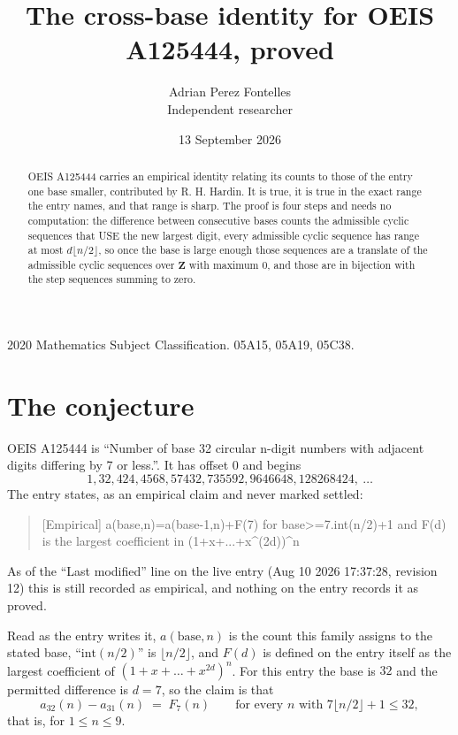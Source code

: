 \documentclass[11pt,a4paper]{article}
\title{The cross-base identity for OEIS A125444, proved}
\author{Adrian Perez Fontelles\\ \small Independent researcher}
\date{13 September 2026}
\theoremstyle{plain}
\theoremstyle{definition}
\begin{document}
\maketitle

\begin{abstract}
OEIS A125444 carries an empirical identity relating its counts to those of the entry one base
smaller, contributed by R. H. Hardin. It is true, it is true in the exact range the entry
names, and that range is sharp. The proof is four steps and needs no computation: the
difference between consecutive bases counts the admissible cyclic sequences that USE the new
largest digit, every admissible cyclic sequence has range at most $d\lfloor n/2\rfloor$, so
once the base is large enough those sequences are a translate of the admissible cyclic
sequences over $\mathbf{Z}$ with maximum $0$, and those are in bijection with the step
sequences summing to zero.
\end{abstract}

\noindent\small 2020 Mathematics Subject Classification. 05A15, 05A19, 05C38.\normalsize

\section{The conjecture}

OEIS A125444 is ``Number of base 32 circular n-digit numbers with adjacent digits differing by 7 or less.''. It has offset $0$ and begins
\[
1, 32, 424, 4568, 57432, 735592, 9646648, 128268424,\ \dots
\]
The entry states, as an empirical claim and never marked settled:
\begin{quote}
[Empirical] a(base,n)=a(base-1,n)+F(7) for base>=7.int(n/2)+1 and F(d) is the largest coefficient in (1+x+...+x\textasciicircum{}(2d))\textasciicircum{}n
\end{quote}
As of the ``Last modified'' line on the live entry (Aug 10 2026 17:37:28, revision 12)
this is still recorded as empirical, and nothing on the entry records it as proved.

Read as the entry writes it, $a(\mathrm{base},n)$ is the count this family assigns to the
stated base, ``$\mathrm{int}(n/2)$'' is $\lfloor n/2\rfloor$, and $F(d)$ is defined on the
entry itself as the largest coefficient of $(1+x+\dots+x^{2d})^{n}$. For this entry
the base is $32$ and the permitted difference is $d=7$, so the claim is that
\[
a_{32}(n)-a_{31}(n)\;=\;F_{7}(n)
\qquad\text{for every } n \text{ with } 7\lfloor n/2\rfloor+1\le32,
\]
that is, for $1\le n\le9$.
\end{document}
